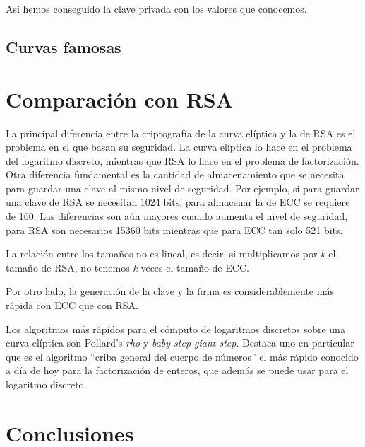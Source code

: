 \documentclass[11pt]{article}
\begin{document}
Así hemos conseguido la clave privada con los valores que conocemos.

\subsection{Curvas famosas}

\section{Comparación con RSA}
\label{sec:RSA}
La principal diferencia entre la criptografía de la curva elíptica y la de RSA es el problema en el que basan su seguridad. La curva elíptica lo hace en el problema del logaritmo discreto, mientras que RSA lo hace en el problema de factorización. Otra diferencia fundamental es la cantidad de almacenamiento que se necesita para guardar una clave al mismo nivel de seguridad. Por ejemplo, si para guardar una clave de RSA se necesitan 1024 bits, para almacenar la de ECC se requiere de 160. Las diferencias son aún mayores cuando aumenta el nivel de seguridad, para RSA son necesarios 15360 bits mientras que para ECC tan solo 521 bits.

La relación entre los tamaños no es lineal, es decir, si multiplicamos por \textit{k} el tamaño de RSA, no tenemos \textit{k} veces el tamaño de ECC.

Por otro lado, la generación de la clave y la firma es considerablemente más rápida con ECC que con RSA.

Los algoritmos más rápidos para el cómputo de logaritmos discretos sobre una curva elíptica son Pollard's \textit{rho} y \textit{baby-step giant-step}. Destaca uno en particular que es el algoritmo ``criba general del cuerpo de números'' el más rápido conocido a día de hoy para la factorización de enteros, que además se puede usar para el logaritmo discreto.

\section{Conclusiones}

\newpage
\printbibliography
\end{document}
